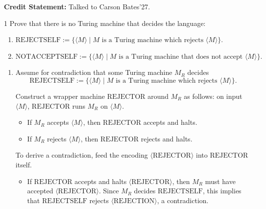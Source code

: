 \documentclass[12pt]{article}
\begin{document}


\textbf{Credit Statement:} Talked to Carson Bates'27.

\begin{problem}{1}
Prove that there is no Turing machine that decides the language:
\begin{enumerate}
    \item $
\text{REJECTSELF} := \{\langle M \rangle \mid M \text{ is a Turing machine which rejects } \langle M \rangle\}.$
    \item $\text{NOTACCEPTSELF} := \{\langle M \rangle \mid M \text{ is a Turing machine that does not accept } \langle M \rangle\}.$
\end{enumerate}
\end{problem}

\begin{solution}
    \bbni
    \begin{enumerate}
        \item Assume for contradiction that some Turing machine $M_R$ decides
            \[
            \text{REJECTSELF} := \{\langle M \rangle \mid M \text{ is a Turing machine which rejects } \langle M \rangle\}.
            \]
            
            Construct a wrapper machine $\text{REJECTOR}$ around $M_R$ as follows: on input $\langle M \rangle$, $\text{REJECTOR}$ runs $M_R$ on $\langle M \rangle$.
            
            \begin{itemize}
                \item If $M_R$ accepts $\langle M \rangle$, then $\text{REJECTOR}$ accepts and halts.
                \item If $M_R$ rejects $\langle M \rangle$, then $\text{REJECTOR}$ rejects and halts.
            \end{itemize}
            
            To derive a contradiction, feed the encoding $\langle \text{REJECTOR} \rangle$ into $\text{REJECTOR}$ itself.
            
            \begin{itemize}
                \item If $\text{REJECTOR}$ accepts and halts $\langle \text{REJECTOR} \rangle$, then $M_R$ must have accepted $\langle \text{REJECTOR} \rangle$. Since $M_R$ decides $\text{REJECTSELF}$, this implies that $\text{REJECTSELF}$ rejects $\langle \text{REJECTION} \rangle$, a contradiction.
            

\end{itemize}
\end{enumerate}
\end{solution}
\end{document}
